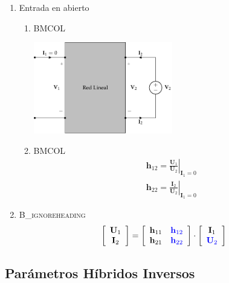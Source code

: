 \begin{enumerate}
\item Entrada en abierto
\label{sec:orgc4ee659}

\begin{enumerate}
\item \hfill{}\textsc{BMCOL}
\label{sec:org4eea1be}

\includegraphics[height=4cm]{../figs/parametrosH_salida.pdf}


\item \hfill{}\textsc{BMCOL}
\label{sec:org3452f57}
\renewcommand{\arraystretch}{2}
\[
  \begin{array}{c}
    \mathbf{h}_{12} = \left.\frac{\mathbf{U}_1}{\mathbf{U}_2}\right\rvert_{\mathbf{I}_1 = 0}\\
    \mathbf{h}_{22} = \left.\frac{\mathbf{I}_2}{\mathbf{U}_2}\right\rvert_{\mathbf{I}_1 = 0}
  \end{array}
\]
\end{enumerate}

\item \hfill{}\textsc{B\_ignoreheading}
\label{sec:org9431e69}
\[
  \left[
    \begin{array}{c}
      \mathbf{U}_1\\
      \mathbf{I}_2
    \end{array}
  \right] =
  \left[
    \begin{array}{cc}
      \mathbf{h}_{11} & \color{blue}{\mathbf{h}_{12}}\\
      \mathbf{h}_{21} & \color{blue}{\mathbf{h}_{22}}
    \end{array}
  \right] \cdot
  \left[
    \begin{array}{c}
      \mathbf{I}_1\\
      \color{blue}{\mathbf{U}_2}
    \end{array}
  \right]
\]
\end{enumerate}


\subsection{Parámetros Híbridos Inversos}
\label{sec:orgbbd88b6}

